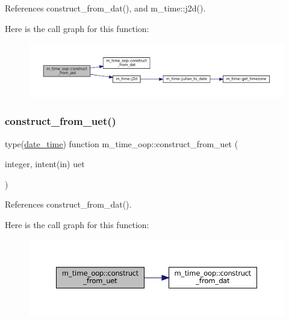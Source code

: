 References construct\+\_\+from\+\_\+dat(), and m\+\_\+time\+::j2d().

Here is the call graph for this function\+:\nopagebreak
\begin{figure}[H]
\begin{center}
\leavevmode
\includegraphics[width=350pt]{namespacem__time__oop_ac7d9aa1885c2b8df613541be8a147064_cgraph}
\end{center}
\end{figure}
\mbox{\label{namespacem__time__oop_ae952d7599526f1b2632452d00363add3}} 
\subsubsection{\texorpdfstring{construct\+\_\+from\+\_\+uet()}{construct\_from\_uet()}}
{\footnotesize\ttfamily type(\mbox{\hyperlink{structm__time__oop_1_1date__time}{date\+\_\+time}}) function m\+\_\+time\+\_\+oop\+::construct\+\_\+from\+\_\+uet (\begin{DoxyParamCaption}\item[{integer, intent(in)}]{uet }\end{DoxyParamCaption})\hspace{0.3cm}{\ttfamily [private]}}



References construct\+\_\+from\+\_\+dat().

Here is the call graph for this function\+:\nopagebreak
\begin{figure}[H]
\begin{center}
\leavevmode
\includegraphics[width=350pt]{namespacem__time__oop_ae952d7599526f1b2632452d00363add3_cgraph}
\end{center}
\end{figure}
\mbox{\label{namespacem__time__oop_aecd1edc1f6ca447d5381c8092eba7924}} 
